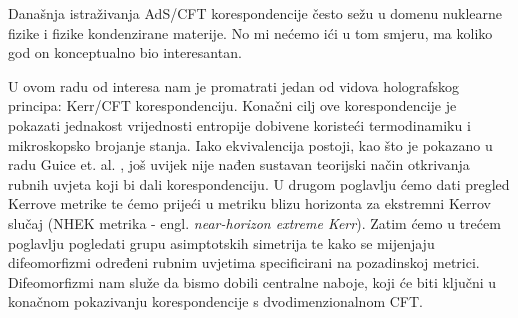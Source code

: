 Današnja istraživanja AdS/CFT korespondencije često sežu u domenu nuklearne fizike i fizike kondenzirane materije. No mi nećemo ići u tom smjeru, ma koliko god on konceptualno bio interesantan.

\bigskip

U ovom radu od interesa nam je promatrati jedan od vidova holografskog principa: Kerr/CFT korespondenciju.
Konačni cilj ove korespondencije je pokazati jednakost vrijednosti entropije dobivene koristeći termodinamiku i mikroskopsko brojanje stanja.
Iako ekvivalencija postoji, kao što je pokazano u radu Guice et. al. \citep{Guica:2008mu}, još uvijek nije nađen sustavan teorijski način otkrivanja rubnih uvjeta koji bi dali korespondenciju.
U drugom poglavlju ćemo dati pregled Kerrove metrike te ćemo prijeći u metriku blizu horizonta za ekstremni Kerrov slučaj (NHEK metrika - engl. \textit{near-horizon extreme Kerr}).
Zatim ćemo u trećem poglavlju pogledati grupu asimptotskih simetrija te kako se mijenjaju difeomorfizmi određeni rubnim uvjetima specificirani na pozadinskoj metrici. Difeomorfizmi nam služe da bismo dobili centralne naboje, koji će biti ključni u konačnom pokazivanju korespondencije s dvodimenzionalnom CFT.

